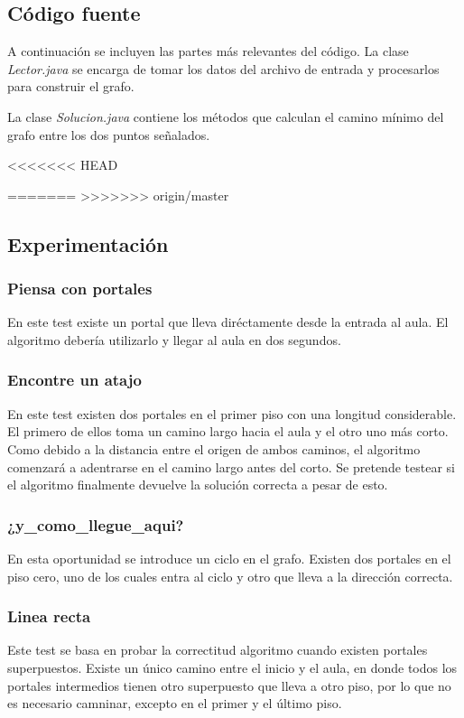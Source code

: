\subsection{Código fuente}
A continuación se incluyen las partes más relevantes del código.
La clase \emph{Lector.java} se encarga de tomar los datos del archivo de entrada y procesarlos para construir el grafo.

La clase \emph{Solucion.java} contiene los métodos que calculan el camino mínimo del grafo entre los dos puntos señalados.


<<<<<<< HEAD

=======
>>>>>>> origin/master
\subsection{Experimentación}

\subsubsection{Piensa con portales}
En este test existe un portal que lleva diréctamente desde la entrada al aula. El algoritmo debería utilizarlo y llegar al aula en dos segundos.

\subsubsection{Encontre un atajo}
En este test existen dos portales en el primer piso con una longitud considerable. El primero de ellos toma un camino largo hacia el aula y el otro uno más corto. Como debido a la distancia entre el origen de ambos caminos, el algoritmo comenzará a adentrarse en el camino largo antes del corto. Se pretende testear si el algoritmo finalmente devuelve la solución correcta a pesar de esto.

\subsubsection{¿y_como_llegue_aqui?}
En esta oportunidad se introduce un ciclo en el grafo. Existen dos portales en el piso cero, uno de los cuales entra al ciclo y otro que lleva a la dirección correcta.

\subsubsection{Linea recta}
Este test se basa en probar la correctitud algoritmo cuando existen portales superpuestos. Existe un único camino entre el inicio y el aula, en donde todos los portales intermedios tienen otro superpuesto que lleva a otro piso, por lo que no es necesario camninar, excepto en el primer y el último piso.

